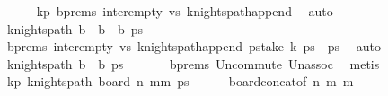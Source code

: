 \begin{isabellebody}
\ \ \ \ \isamarkupfalse%
\ kp{}{\isacharprime}{\kern0pt}\ b{\isacharunderscore}{\kern0pt}prems\ inter{\isacharunderscore}{\kern0pt}empty\ vs\ knights{\isacharunderscore}{\kern0pt}path{\isacharunderscore}{\kern0pt}append\ \isamarkupfalse%
\ auto\isanewline
\ \ \isamarkupfalse%
\ \isamarkupfalse%
\ {\isachardoublequoteopen}knights{\isacharunderscore}{\kern0pt}path\ {\isacharparenleft}{\kern0pt}b\ {\isasymunion}\ {\isacharquery}{\kern0pt}b{\isacharprime}{\kern0pt}\ {\isasymunion}\ b\ {\isacharquery}{\kern0pt}ps{\isachardoublequoteclose}\isanewline
\ \ \ \ \isamarkupfalse%
\ b{\isacharunderscore}{\kern0pt}prems\ inter{\isacharunderscore}{\kern0pt}empty\ vs\ knights{\isacharunderscore}{\kern0pt}path{\isacharunderscore}{\kern0pt}append{\isacharbrackleft}{\kern0pt}\ pstake\ k\ ps\ {\isacharat}{\kern0pt}\ {\isacharquery}{\kern0pt}ps\ \isamarkupfalse%
\ auto\isanewline
\ \ \isamarkupfalse%
\ \isamarkupfalse%
\ {\isachardoublequoteopen}knights{\isacharunderscore}{\kern0pt}path\ {\isacharparenleft}{\kern0pt}{\isacharquery}{\kern0pt}b\ {\isasymunion}\ {\isacharquery}{\kern0pt}b{\isacharprime}{\kern0pt}{\isacharparenright}{\kern0pt}\ {\isacharquery}{\kern0pt}ps{\isachardoublequoteclose}\ \isanewline
\ \ \ \ \isamarkupfalse%
\ b{\isacharunderscore}{\kern0pt}prems\ Un{\isacharunderscore}{\kern0pt}commute\ Un{\isacharunderscore}{\kern0pt}assoc\ \isamarkupfalse%
\ metis\isanewline
\ \ \isamarkupfalse%
\ \isamarkupfalse%
\ kp{\isacharcolon}{\kern0pt}\ {\isachardoublequoteopen}knights{\isacharunderscore}{\kern0pt}path\ {\isacharparenleft}{\kern0pt}board\ n\ {\isacharparenleft}{\kern0pt}mm\ {\isacharquery}{\kern0pt}ps{\isachardoublequoteclose}\isanewline
\ \ \ \ \isamarkupfalse%
\ board{\isacharunderscore}{\kern0pt}concat{\isacharbrackleft}{\kern0pt}of\ n\ m\ m\ \isamarkupfalse%

\end{isabellebody}
